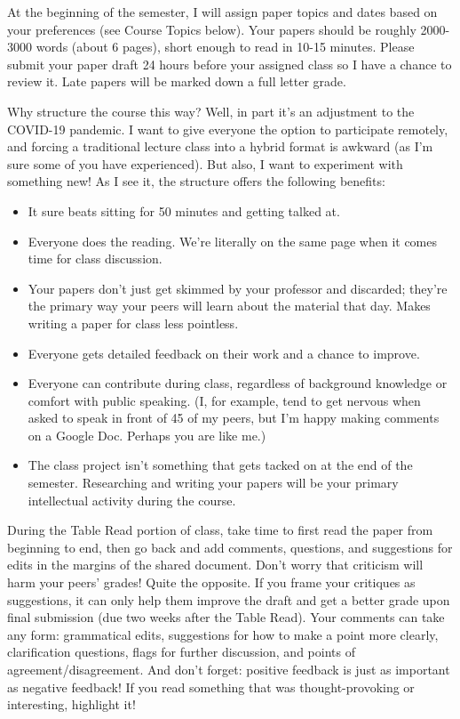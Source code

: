 \documentclass[11pt, letterpaper]{article}
\begin{document}
At the beginning of the semester, I will assign paper topics and dates based on your preferences (see Course Topics below). Your papers should be roughly 2000-3000 words (about 6 pages), short enough to read in 10-15 minutes. Please submit your paper draft 24 hours before your assigned class so I have a chance to review it. Late papers will be marked down a full letter grade.
 
Why structure the course this way? Well, in part it's an adjustment to the COVID-19 pandemic. I want to give everyone the option to participate remotely, and forcing a traditional lecture class into a hybrid format is awkward (as I'm sure some of you have experienced). But also, I want to experiment with something new! As I see it, the structure offers the following benefits:

\begin{itemize}
	\item It sure beats sitting for 50 minutes and getting talked at.
	\item Everyone does the reading. We're literally on the same page when it comes time for class discussion.
	\item Your papers don't just get skimmed by your professor and discarded; they're the primary way your peers will learn about the material that day. Makes writing a paper for class less pointless.
	\item Everyone gets detailed feedback on their work and a chance to improve.
	\item Everyone can contribute during class, regardless of background knowledge or comfort with public speaking. (I, for example, tend to get nervous when asked to speak in front of 45 of my peers, but I’m happy making comments on a Google Doc. Perhaps you are like me.)
	\item The class project isn't something that gets tacked on at the end of the semester. Researching and writing your papers will be your primary intellectual activity during the course.
\end{itemize}

\noindent During the Table Read portion of class, take time to first read the paper from beginning to end, then go back and add comments, questions, and suggestions for edits in the margins of the shared document. Don't worry that criticism will harm your peers' grades! Quite the opposite. If you frame your critiques as suggestions, it can only help them improve the draft and get a better grade upon final submission (due two weeks after the Table Read). Your comments can take any form: grammatical edits, suggestions for how to make a point more clearly, clarification questions, flags for further discussion, and points of agreement/disagreement. And don't forget: positive feedback is just as important as negative feedback! If you read something that was thought-provoking or interesting, highlight it!
\end{document}
